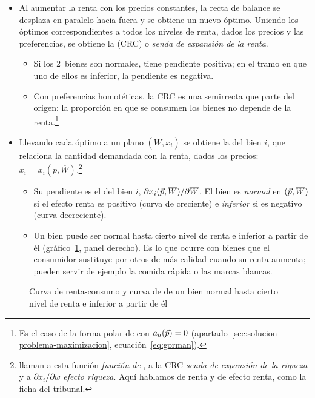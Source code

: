 \documentclass[11pt]{article}
\begin{document}
\begin{itemize}
\item Al aumentar la renta con los precios constantes, la recta de balance se desplaza en paralelo hacia fuera y se obtiene un nuevo óptimo. Uniendo los óptimos correspondientes a todos los niveles de renta, dados los precios y las preferencias, se obtiene la  (CRC) o \emph{senda de expansión de la renta}.
  \begin{itemize}
  \item Si los 2~bienes son normales, tiene pendiente positiva; en el tramo en que uno de ellos es inferior, la pendiente es negativa.
  \item Con preferencias homotéticas, la CRC es una semirrecta que parte del origen: la proporción en que se consumen los bienes no depende de la renta.\footnote{Es el caso de la forma polar de  con $a_h(\vec{p})=0$ (apartado~\ref{sec:solucion-problema-maximizacion}, ecuación~\eqref{eq:gorman}).}
  \end{itemize}
\item Llevando cada óptimo a un plano $(\overline{W},x_i)$ se obtiene la  del bien $i$, que relaciona la cantidad demandada con la renta, dados los precios: $x_i=x_i(\bar{p},\overline{W})$.\footnote{\textcite[§2.E]{MasColellWhinstonGreen1995} llaman a esta función \emph{función de }, a la CRC \emph{senda de expansión de la riqueza} y a $\partial x_i/\partial w$ \emph{efecto riqueza}. Aquí hablamos de renta y de efecto renta, como la ficha del tribunal.}
  \begin{itemize}
  \item Su pendiente es el  del bien $i$, $\partial x_i(\vec{p},\overline{W})/\partial\overline{W}$. El bien es \emph{normal} en $(\vec{p},\overline{W})$ si el efecto renta es positivo (curva de  creciente) e \emph{inferior} si es negativo (curva decreciente).
  \item Un bien puede ser normal hasta cierto nivel de renta e inferior a partir de él (gráfico~\ref{fig:renta-consumo-engel}, panel derecho). Es lo que ocurre con bienes que el consumidor sustituye por otros de más calidad cuando su renta aumenta; pueden servir de ejemplo la comida rápida o las marcas blancas.
  \end{itemize}
\end{itemize}

\begin{figure}[H]
\centering
\caption{Curva de renta-consumo y curva de  de un bien normal hasta cierto nivel de renta e inferior a partir de él}\label{fig:renta-consumo-engel}
\end{figure}
\end{document}
